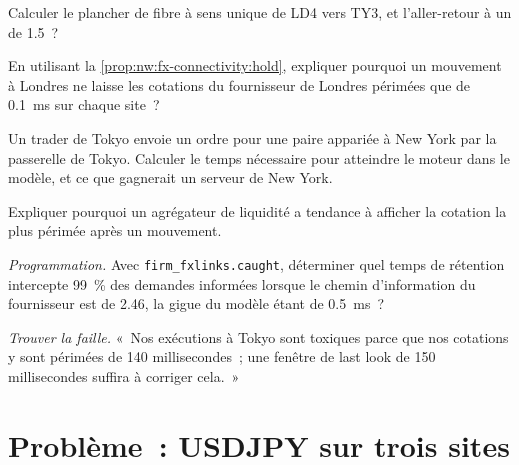 \begin{exercise}[$\star$]\label{exo:nw:fx-connectivity:3}
Calculer le plancher de fibre à sens unique de LD4 vers TY3, et l'aller-retour à un  de 1.5~?
\end{exercise}

\begin{exercise}[$\star\star$]\label{exo:nw:fx-connectivity:4}
En utilisant la \cref{prop:nw:fx-connectivity:hold}, expliquer pourquoi un mouvement à Londres ne laisse les cotations du fournisseur de Londres
périmées que de \qty{0.1}{\milli\second} sur chaque site~?
\end{exercise}

\begin{exercise}[$\star\star$]\label{exo:nw:fx-connectivity:5}
Un trader de Tokyo envoie un ordre pour une paire appariée à New York par la passerelle de Tokyo. Calculer le temps nécessaire pour atteindre le moteur dans le
modèle, et ce que gagnerait un serveur de New York.
\end{exercise}

\begin{exercise}[$\star\star$]\label{exo:nw:fx-connectivity:6}
Expliquer pourquoi un agrégateur de liquidité a tendance à afficher la cotation la plus périmée après un mouvement.
\end{exercise}

\begin{exercise}[$\star\star\star$]\label{exo:nw:fx-connectivity:7}
\emph{Programmation.} Avec \texttt{firm\_fxlinks.caught}, déterminer quel temps de rétention intercepte 99~\% des demandes informées lorsque le chemin d'information du fournisseur
est de 2.46, la gigue du modèle étant de \qty{0.5}{\milli\second}~?
\end{exercise}

\begin{exercise}[$\star\star\star$]\label{exo:nw:fx-connectivity:8}
\emph{Trouver la faille.} «~Nos exécutions à Tokyo sont toxiques parce que nos cotations y sont périmées de 140 millisecondes~; une fenêtre de last look
de 150 millisecondes suffira à corriger cela.~»
\end{exercise}

\section{Problème~: USDJPY sur trois sites}

